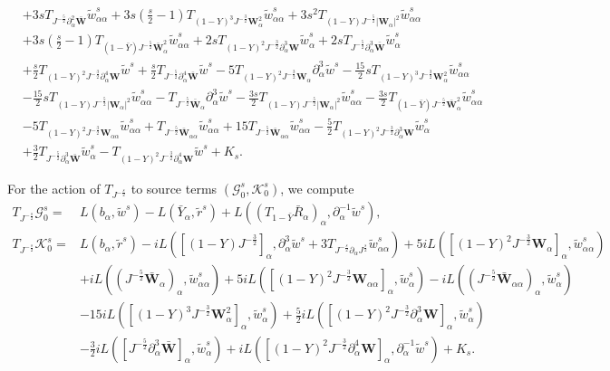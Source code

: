 \documentclass[10pt]{amsart}
\theoremstyle{remark}
\theoremstyle{definition}
\numberwithin{equation}{section}
\newcommand{\p}{\partial}
\newcommand{\al}{\alpha}
\newcommand{\f}{\frac}
\newcommand{\bw}{\mathbf{W}}
\begin{document}
\begin{align*}
&+3s T_{J^{-\f52}\p^2_{\al}\bar{\bw}}\tilde{w}^s_{\al\al}+3s\left(\f{s}{2}-1\right)T_{(1-Y)^3J^{-\f32}\bw^2_{\al}}\tilde{w}^s_{\al\al}+3s^2T_{(1-Y)J^{-\f52}|\bw_{\al}|^2}\tilde{w}^s_{\al\al} \\
&+3s\left(\f{s}{2}-1\right)T_{(1-\bar{Y})J^{-\f52}\bar{\bw}_{\al}^2}\tilde{w}^s_{\al\al}+2s T_{(1-Y)^2J^{-\f32}\p^3_{\al}\bw}\tilde{w}^s_{\al}+2s T_{J^{-\f52}\p^3_{\al}\bar{\bw}}\tilde{w}^s_{\al}\\
&+\f{s}{2} T_{(1-Y)^2J^{-\f32}\p^4_{\al}\bw}\tilde{w}^s +\f{s}{2} T_{J^{-\f52}\p^4_{\al}\bar{\bw}}\tilde{w}^s-5T_{(1-Y)^2J^{-\f32}\mathbf{W}_{\al}}\p^3_{\al}\tilde{w}^s-\f{15}{2}s T_{(1-Y)^3J^{-\f32}\mathbf{W}^2_{\al}}\tilde{w}^s_{\al\al} \\
&-\f{15}{2}s T_{(1-Y)J^{-\f52}|\mathbf{W}_{\al}|^2}\tilde{w}^s_{\al\al}-T_{J^{-\f52}\bar{\bw}_{\al}}\p^3_{\al}\tilde{w}^s-\f{3s}{2} T_{(1-Y)J^{-\f52}|\bw_{\al}|^2}\tilde{w}^s_{\al\al}-\f{3s}{2} T_{(1-\bar{Y})J^{-\f52}\bar{\bw}_{\al}^2}\tilde{w}^s_{\al\al} \\
&-5T_{(1-Y)^2J^{-\f32}\mathbf{W}_{\al\al}}\tilde{w}^s_{\al\al} +T_{J^{-\f52}\bar{\mathbf{W}}_{\al\al}}\tilde{w}^s_{\al\al} +15T_{J^{-\f52}\bar{\mathbf{W}}_{\al\al}}\tilde{w}^s_{\al\al}-\f52T_{(1-Y)^2J^{-\f32}\p^3_{\al}\mathbf{W}}\tilde{w}^s_{\al}\\
&+\f32T_{J^{-\f52}\p^3_{\al}\bar{\mathbf{W}}}\tilde{w}^s_{\al}-T_{(1-Y)^2J^{-\f32}\p^4_{\al}\mathbf{W}}\tilde{w}^s+K_s.
\end{align*}

For the action of $T_{J^{-\f{s}{2}}}$ to source terms $(\mathcal{G}^s_0, \mathcal{K}^s_0)$, we compute
\begin{align*}
T_{J^{-\f{s}{2}}} \mathcal{G}^s_0 =& L(b_\alpha, \tilde{w}^s)-L(\bar{Y}_\alpha, \tilde{r}^s) + L( (T_{1-\bar{Y}}\bar{R}_\alpha)_\alpha,\partial_\alpha^{-1}\tilde{w}^s) ,\\
T_{J^{-\f{s}{2}}} \mathcal{K}^s_0 =& L(b_\alpha, \tilde{r}^s) -iL( [(1-Y)J^{-\f32}]_\al,\p^3_{\al}\tilde{w}^s+3T_{J^{-\f{s}{2}}\p_{\al}J^{\f{s}{2}}}\tilde{w}^s_{\al\al}) +5iL([(1-Y)^2J^{-\f32}\bw_\al]_\al, \tilde{w}^s_{\al\al})\\
&+iL((J^{-\f52}\bar{\bw}_\al)_\al, \tilde{w}^s_{\al\al}) +5iL([(1-Y)^2J^{-\f32}\bw_{\al\al}]_\al,  \tilde{w}^s_\al)- iL((J^{-\f52}\bar{\bw}_{\al\al})_\al, \tilde{w}^s_\al) \\
    &-15i L([(1-Y)^3J^{-\f32}\bw_\al^2]_\al,  \tilde{w}^s_\al) + \f52i L([(1-Y)^2J^{-\f32}\p_\al^3\bw]_\al,  \tilde{w}^s_{\al}) \\
    &-\f32iL([J^{-\f52}\p_\al^3 \bar{\bw}]_\al, \tilde{w}^s_{\al}) + iL([(1-Y)^2J^{-\f32}\p_\al^4\bw]_\al,  \p_\al^{-1}\tilde{w}^s) + K_s.
\end{align*}
\end{document}
